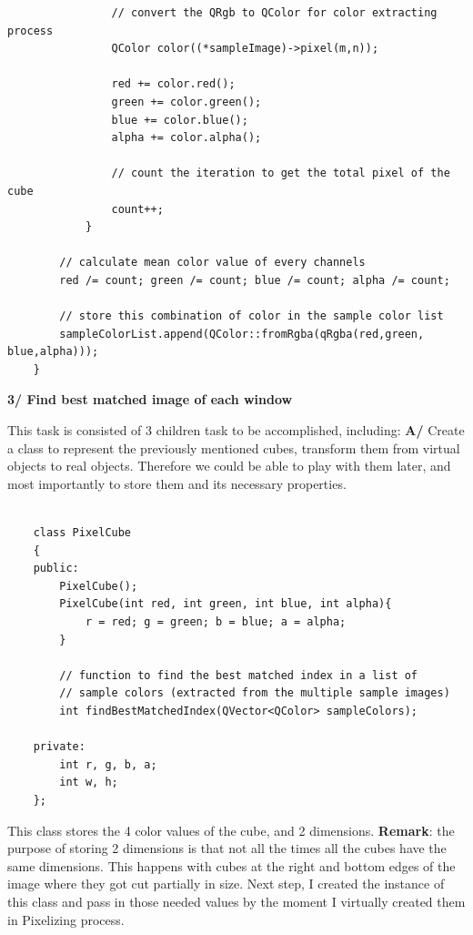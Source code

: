 \documentclass[english]{article}
\begin{document}
{\begin{lstlisting}
				// convert the QRgb to QColor for color extracting process
				QColor color((*sampleImage)->pixel(m,n));
				
				red += color.red();
				green += color.green();
				blue += color.blue();
				alpha += color.alpha();
				
				// count the iteration to get the total pixel of the cube
				count++;
			}
		
		// calculate mean color value of every channels
		red /= count; green /= count; blue /= count; alpha /= count;
		
		// store this combination of color in the sample color list
		sampleColorList.append(QColor::fromRgba(qRgba(red,green, blue,alpha)));
	}

\end{lstlisting}


\textbf{3/ Find best matched image of each window} \newline

This task is consisted of 3 children task to be accomplished, including: \newline\newline
	\textbf{A/} Create a class to represent the previously mentioned cubes, transform them from virtual objects to real objects. Therefore we could be able to play with them later, and most importantly to store them and its necessary properties.

\lstset{language=C++}
\begin{lstlisting}
	
	class PixelCube
	{
	public:
		PixelCube();
		PixelCube(int red, int green, int blue, int alpha){
			r = red; g = green; b = blue; a = alpha;
		}
		
		// function to find the best matched index in a list of
		// sample colors (extracted from the multiple sample images)
		int findBestMatchedIndex(QVector<QColor> sampleColors);
		
	private:
		int r, g, b, a;
		int w, h;
	};

\end{lstlisting}

This class stores the 4 color values of the cube, and 2 dimensions. \newline\newline
\textbf{Remark}: the purpose of storing 2 dimensions is that not all the times all the cubes have the same dimensions. This happens with cubes at the right and bottom edges of the image where they got cut partially in size.\newline\newline
Next step, I created the instance of this class and pass in those needed values by the moment I virtually created them in Pixelizing process.

}
\end{document}
